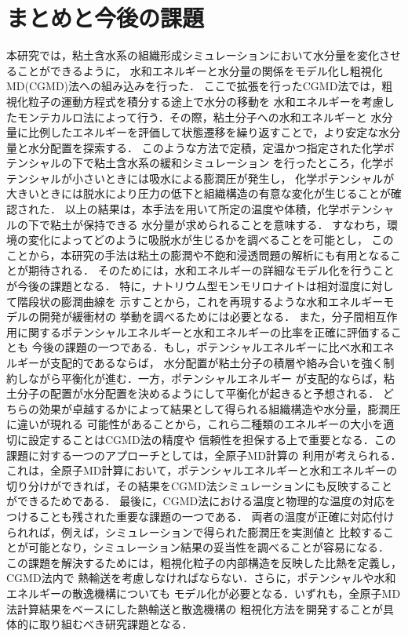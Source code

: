 ﻿\documentclass[11pt,a4j]{jarticle}
\begin{document}
\section{まとめと今後の課題}
本研究では，粘土含水系の組織形成シミュレーションにおいて水分量を変化させることができるように，
水和エネルギーと水分量の関係をモデル化し粗視化MD(CGMD)法への組み込みを行った．
ここで拡張を行ったCGMD法では，粗視化粒子の運動方程式を積分する途上で水分の移動を
水和エネルギーを考慮したモンテカルロ法によって行う．その際，粘土分子への水和エネルギーと
水分量に比例したエネルギーを評価して状態遷移を繰り返すことで，より安定な水分量と水分配置を探索する．
このような方法で定積，定温かつ指定された化学ポテンシャルの下で粘土含水系の緩和シミュレーション
を行ったところ，化学ポテンシャルが小さいときには吸水による膨潤圧が発生し，
化学ポテンシャルが大きいときには脱水により圧力の低下と組織構造の有意な変化が生じることが確認された．
以上の結果は，本手法を用いて所定の温度や体積，化学ポテンシャルの下で粘土が保持できる
水分量が求められることを意味する．
すなわち，環境の変化によってどのように吸脱水が生じるかを調べることを可能とし，
このことから，本研究の手法は粘土の膨潤や不飽和浸透問題の解析にも有用となることが期待される．
そのためには，水和エネルギーの詳細なモデル化を行うことが今後の課題となる．
特に，ナトリウム型モンモリロナイトは相対湿度に対して階段状の膨潤曲線を
示すことから，これを再現するような水和エネルギーモデルの開発が緩衝材の
挙動を調べるためには必要となる．
また，分子間相互作用に関するポテンシャルエネルギーと水和エネルギーの比率を正確に評価することも
今後の課題の一つである．もし，ポテンシャルエネルギーに比べ水和エネルギーが支配的であるならば，
水分配置が粘土分子の積層や絡み合いを強く制約しながら平衡化が進む．一方，ポテンシャルエネルギー
が支配的ならば，粘土分子の配置が水分配置を決めるようにして平衡化が起きると予想される．
どちらの効果が卓越するかによって結果として得られる組織構造や水分量，膨潤圧に違いが現れる
可能性があることから，これら二種類のエネルギーの大小を適切に設定することはCGMD法の精度や
信頼性を担保する上で重要となる．この課題に対する一つのアプローチとしては，全原子MD計算の
利用が考えられる．これは，全原子MD計算において，ポテンシャルエネルギーと水和エネルギーの
切り分けができれば，その結果をCGMD法シミュレーションにも反映することができるためである．
最後に，CGMD法における温度と物理的な温度の対応をつけることも残された重要な課題の一つである．
両者の温度が正確に対応付けられれば，例えば，シミュレーションで得られた膨潤圧を実測値と
比較することが可能となり，シミュレーション結果の妥当性を調べることが容易になる．
この課題を解決するためには，粗視化粒子の内部構造を反映した比熱を定義し，CGMD法内で
熱輸送を考慮しなければならない．さらに，ポテンシャルや水和エネルギーの散逸機構についても
モデル化が必要となる．いずれも，全原子MD法計算結果をベースにした熱輸送と散逸機構の
粗視化方法を開発することが具体的に取り組むべき研究課題となる．
%
\end{document}
